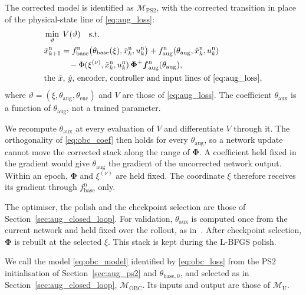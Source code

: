 The corrected model is identified as $\mathcal M_{\mathrm{PS2}}$, with the
corrected transition in place of the physical-state line
of \eqref{eq:aug_loss}:
\begin{equation}
\begin{aligned}
 &\min_{\vartheta}\;V(\vartheta)\quad\text{s.t.}\\
 &\tilde x^{\mathrm n}_{k+1}
 =f^{\mathrm n}_{\mathrm{base}}\bigl(\theta_{\mathrm{base}}(\xi),\tilde x^{\mathrm n}_k,u^{\mathrm n}_k\bigr)
  +f^{\mathrm n}_{\mathrm{aug}}(\theta_{\mathrm{aug}},\hat x^{\mathrm n}_k,u^{\mathrm n}_k)\\
 &\qquad\quad-\Phi(\xi^{(\nu)},\tilde x^{\mathrm n}_k,u^{\mathrm n}_k)\,
  \boldsymbol\Phi^{+}\boldsymbol f^{\mathrm n}_{\mathrm{aug}}(\theta_{\mathrm{aug}}),\\
 &\text{the $\bar x$, $\hat y$, encoder, controller and input lines
   of \eqref{eq:aug_loss}},
\end{aligned}
\label{eq:obc_loss}
\end{equation}
where $\vartheta=(\xi,\theta_{\mathrm{aug}},\theta_{\mathrm{enc}})$ and $V$
are those of \eqref{eq:aug_loss}.
The coefficient $\theta_{\mathrm{aux}}$ is a function of
$\theta_{\mathrm{aug}}$, not a trained parameter.

We recompute $\theta_{\mathrm{aux}}$ at every evaluation of $V$ and
differentiate $V$ through it.
The orthogonality of \eqref{eq:obc_coef} then holds for every
$\theta_{\mathrm{aug}}$, so a network update cannot move the corrected stack
along the range of $\boldsymbol\Phi$.
A coefficient held fixed in the gradient would give $\theta_{\mathrm{aug}}$
the gradient of the uncorrected network output.
Within an epoch, $\boldsymbol\Phi$ and $\xi^{(\nu)}$ are held fixed.
The coordinate $\xi$ therefore receives its gradient through
$f^{\mathrm n}_{\mathrm{base}}$ only.

The optimiser, the polish and the checkpoint selection are those of
Section~\ref{sec:aug_closed_loop}.
For validation, $\theta_{\mathrm{aux}}$ is computed once from the current
network and held fixed over the rollout, as
in~\cite[Eq.~(13)]{gyorok2026obc}.
After checkpoint selection, $\boldsymbol\Phi$ is rebuilt at the selected
$\xi$.
This stack is kept during the L-BFGS polish.

We call the model \eqref{eq:obc_model} identified by \eqref{eq:obc_loss}
from the PS2 initialisation of Section~\ref{sec:aug_ps2} and
$\theta_{\mathrm{base},0}$, and selected as in
Section~\ref{sec:aug_closed_loop}, $\mathcal M_{\mathrm{OBC}}$.
Its inputs and output are those of $\mathcal M_{\mathrm U}$.


